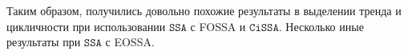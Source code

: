 \documentclass[12pt, specialist, subf
]{disser}
\theoremstyle{definition}
\newcommand{\SSA}{\texttt{SSA}}
\newcommand{\CISSA}{\texttt{CiSSA}}
\newcommand{\MSSA}{\texttt{MSSA}}
\newcommand{\DSSA}{\texttt{2d-SSA}}
\newcommand{\TS}{\mathsf{X}}
\begin{document}
Таким образом, получились довольно похожие результаты в выделении тренда и цикличности при использовании $\SSA$ с FOSSA и $\CISSA$. Несколько иные результаты при $\SSA$ с EOSSA.

\newpage















\end{document}
